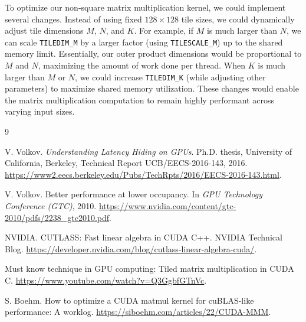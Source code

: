 \documentclass[letterpaper,twocolumn,10pt]{article}
\begin{document}
To optimize our non-square matrix multiplication kernel, we could implement several
changes. Instead of using fixed $128\times128$ tile sizes, we could dynamically adjust
tile dimensions $M$, $N$, and $K$. For example, if $M$ is much larger than $N$, we can
scale \texttt{TILEDIM\_M} by a larger factor (using \texttt{TILESCALE\_M}) up to the
shared memory limit. Essentially, our outer product dimensions would be proportional
to $M$ and $N$, maximizing the amount of work done per thread. When $K$ is much larger
than $M$ or $N$, we could increase \texttt{TILEDIM\_K} (while adjusting other
parameters) to maximize shared memory utilization. These changes would enable the
matrix multiplication computation to remain highly performant across varying input
sizes.

\begin{thebibliography}{9}

V. Volkov. \textit{Understanding Latency Hiding on GPUs}. Ph.D. thesis, University of
California, Berkeley, Technical Report UCB/EECS-2016-143, 2016.
\url{https://www2.eecs.berkeley.edu/Pubs/TechRpts/2016/EECS-2016-143.html}.

V. Volkov. Better performance at lower occupancy. In \textit{GPU Technology Conference
(GTC)}, 2010.
\url{https://www.nvidia.com/content/gtc-2010/pdfs/2238_gtc2010.pdf}.

NVIDIA. CUTLASS: Fast linear algebra in CUDA C++. NVIDIA Technical Blog.
\url{https://developer.nvidia.com/blog/cutlass-linear-algebra-cuda/}.

Must know technique in GPU computing: Tiled matrix multiplication in CUDA C.
\url{https://www.youtube.com/watch?v=Q3GgbfGTnVc}.

S. Boehm. How to optimize a CUDA matmul kernel for cuBLAS-like performance: A worklog.
\url{https://siboehm.com/articles/22/CUDA-MMM}.

\end{thebibliography}

\balance
\end{document}
